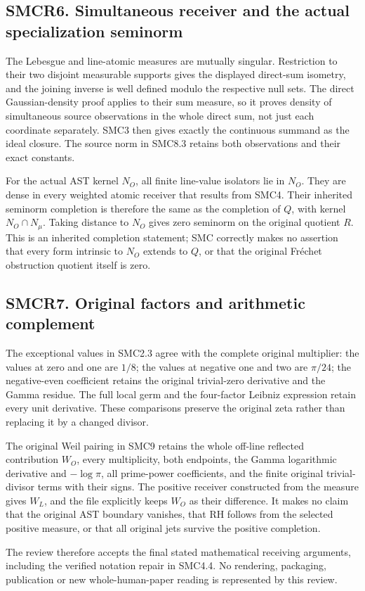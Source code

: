 \subsection{SMCR6. Simultaneous receiver and the actual specialization
seminorm}\label{smcr6.-simultaneous-receiver-and-the-actual-specialization-seminorm}

The Lebesgue and line-atomic measures are mutually singular. Restriction
to their two disjoint measurable supports gives the displayed direct-sum
isometry, and the joining inverse is well defined modulo the respective
null sets. The direct Gaussian-density proof applies to their sum
measure, so it proves density of simultaneous source observations in the
whole direct sum, not just each coordinate separately. SMC3 then gives
exactly the continuous summand as the ideal closure. The source norm in
SMC8.3 retains both observations and their exact constants.

For the actual AST kernel \(N_O\), all finite line-value isolators lie
in \(N_O\). They are dense in every weighted atomic receiver that
results from SMC4. Their inherited seminorm completion is therefore the
same as the completion of \(Q\), with kernel \(N_O\cap N_\mu\). Taking
distance to \(N_O\) gives zero seminorm on the original quotient \(R\).
This is an inherited completion statement; SMC correctly makes no
assertion that every form intrinsic to \(N_O\) extends to \(Q\), or that
the original Fréchet obstruction quotient itself is zero.

\subsection{SMCR7. Original factors and arithmetic
complement}\label{smcr7.-original-factors-and-arithmetic-complement}

The exceptional values in SMC2.3 agree with the complete original
multiplier: the values at zero and one are \(1/8\); the values at
negative one and two are \(\pi/24\); the negative-even coefficient
retains the original trivial-zero derivative and the Gamma residue. The
full local germ and the four-factor Leibniz expression retain every unit
derivative. These comparisons preserve the original zeta rather than
replacing it by a changed divisor.

The original Weil pairing in SMC9 retains the whole off-line reflected
contribution \(W_O\), every multiplicity, both endpoints, the Gamma
logarithmic derivative and \(-\log\pi\), all prime-power coefficients,
and the finite original trivial-divisor terms with their signs. The
positive receiver constructed from the measure gives \(W_L\), and the
file explicitly keeps \(W_O\) as their difference. It makes no claim
that the original AST boundary vanishes, that RH follows from the
selected positive measure, or that all original jets survive the
positive completion.

The review therefore accepts the final stated mathematical receiving
arguments, including the verified notation repair in SMC4.4. No
rendering, packaging, publication or new whole-human-paper reading is
represented by this review.
